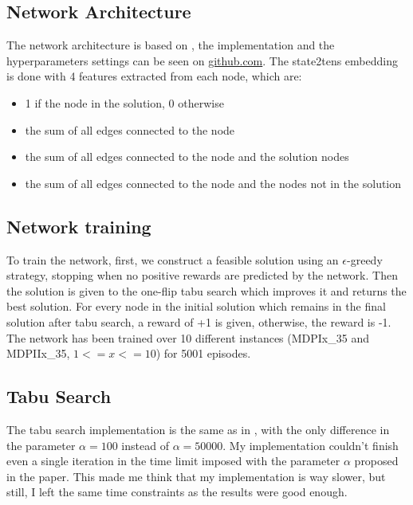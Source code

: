 \documentclass{article}
\begin{document}
\subsection{Network Architecture}
The network architecture is based on \cite{dai2017learning}, the implementation
and the hyperparameters settings can be seen on
\href{https://github.com/LucaLumetti/DQNTS}{github.com}. The state2tens embedding is
done with 4 features extracted from each node, which are:
\begin{itemize}
  \item{1 if the node in the solution, 0 otherwise}
  \item{the sum of all edges connected to the node}
  \item{the sum of all edges connected to the node and the solution nodes}
  \item{the sum of all edges connected to the node and the nodes not in the solution}
\end{itemize}

\subsection{Network training}
To train the network, first, we construct a feasible solution using an
$\epsilon$-greedy strategy, stopping when no positive rewards are predicted by
the network.  Then the solution is given to the one-flip tabu search which
improves it and returns the best solution. For every node in the initial solution which remains
in the final solution after tabu search, a reward of +1 is given, otherwise, the
reward is -1. The network has been trained over 10 different instances (MDPIx\_35
and MDPIIx\_35, $1 <= x <= 10$) for 5001 episodes.

\subsection{Tabu Search}
The tabu search implementation is the same as in \cite{nijimbere2020tabu}, with the only
difference in the parameter $\alpha = 100$ instead of $\alpha = 50000$. My
implementation couldn't finish even a single iteration in the time limit imposed
with the parameter $\alpha$ proposed in the paper. This made me think that my
implementation is way slower, but still, I left the same
time constraints as the results were good enough.\\
\end{document}

